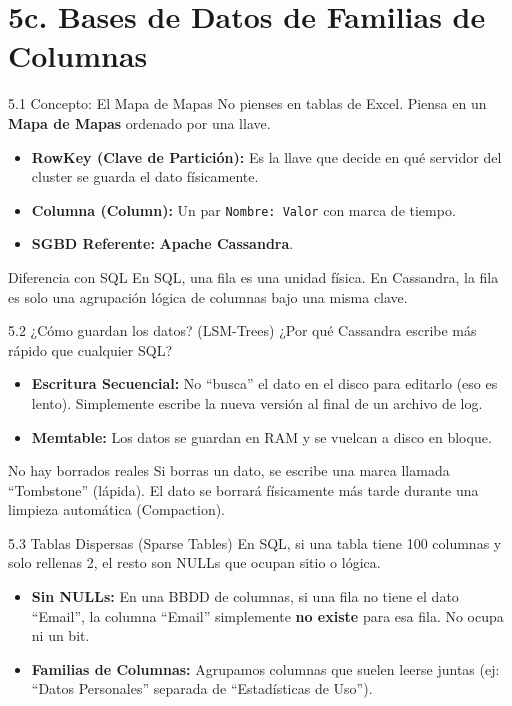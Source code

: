 \section{5c. Bases de Datos de Familias de Columnas}

\begin{frame}{5.1 Concepto: El Mapa de Mapas}
    No pienses en tablas de Excel. Piensa en un \textbf{Mapa de Mapas} ordenado por una llave.
    \begin{itemize}
        \item \textbf{RowKey (Clave de Partición):} Es la llave que decide en qué servidor del cluster se guarda el dato físicamente.
        \item \textbf{Columna (Column):} Un par \texttt{Nombre: Valor} con marca de tiempo.
        \item \textbf{SGBD Referente:} \textbf{Apache Cassandra}.
    \end{itemize}
    \begin{exampleblock}{Diferencia con SQL}
        En SQL, una fila es una unidad física. En Cassandra, la fila es solo una agrupación lógica de columnas bajo una misma clave.
    \end{exampleblock}
\end{frame}

\begin{frame}{5.2 ¿Cómo guardan los datos? (LSM-Trees)}
    ¿Por qué Cassandra escribe más rápido que cualquier SQL?
    \begin{itemize}
        \item \textbf{Escritura Secuencial:} No ``busca'' el dato en el disco para editarlo (eso es lento). Simplemente escribe la nueva versión al final de un archivo de log.
        \item \textbf{Memtable:} Los datos se guardan en RAM y se vuelcan a disco en bloque.
    \end{itemize}
    \begin{alertblock}{No hay borrados reales}
        Si borras un dato, se escribe una marca llamada ``Tombstone'' (lápida). El dato se borrará físicamente más tarde durante una limpieza automática (Compaction).
    \end{alertblock}
\end{frame}

\begin{frame}{5.3 Tablas Dispersas (Sparse Tables)}
    En SQL, si una tabla tiene 100 columnas y solo rellenas 2, el resto son NULLs que ocupan sitio o lógica.
    \begin{itemize}
        \item \textbf{Sin NULLs:} En una BBDD de columnas, si una fila no tiene el dato ``Email'', la columna ``Email'' simplemente \textbf{no existe} para esa fila. No ocupa ni un bit.
        \item \textbf{Familias de Columnas:} Agrupamos columnas que suelen leerse juntas (ej: ``Datos Personales'' separada de ``Estadísticas de Uso'').
    \end{itemize}
\end{frame}

